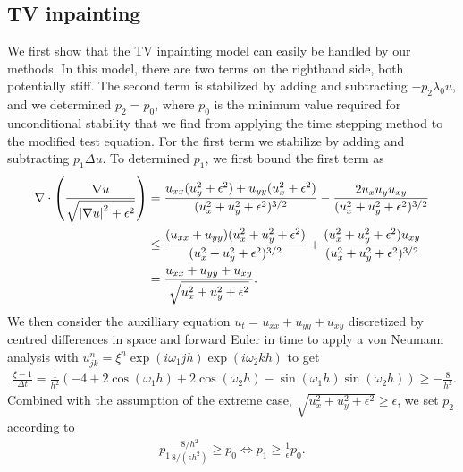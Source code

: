 \subsection{TV inpainting}
We first show that the TV inpainting model can easily be handled by our methods. In this model, there are two terms on the righthand side, both potentially stiff.  The second term is stabilized by adding and subtracting $-p_2\lambda_0 u$, and we determined $p_2=p_0$, where $p_0$ is the minimum value required for unconditional stability that we find from applying the time stepping method to the modified test equation. For the first term we stabilize by adding and subtracting $p_1\Delta u$. To determined $p_1$, we first bound the first term as 
\begin{align}
\begin{split}
        \nabla \cdot \left(\frac{\nabla u}{\sqrt{\left|\nabla u\right|^2 + \epsilon^2}} \right) 
&= \frac{u_{xx}(u_y^2 + \epsilon^2) + u_{yy}(u_x^2 + \epsilon^2)}{(u_x^2 + u_y^2 + \epsilon^2)^{3/2}} 
- \frac{2u_xu_y u_{xy}}{(u_x^2 + u_y^2 + \epsilon^2)^{3/2}} 
\\
&\leq \frac{(u_{xx}+u_{yy})(u_x^2 + u_y^2 + \epsilon^2)}{(u_x^2 + u_y^2 + \epsilon^2)^{3/2}} + \frac{(u_x^2 + u_y^2 + \epsilon^2)u_{xy}}{(u_x^2 + u_y^2 + \epsilon^2)^{3/2}}  
\\
&= \frac{u_{xx} + u_{yy} + u_{xy}}{\sqrt{u_x^2 + u_y^2 + \epsilon^2}}.
\end{split}
\label{p1 estimate inpaint 1}
\end{align}
We then consider the auxilliary equation $u_t = u_{xx} + u_{yy} + u_{xy}$ discretized by centred differences in space and forward Euler in time to apply a von Neumann analysis with $u^n_{jk} = \xi^n \exp(i\omega_1jh)\exp(i\omega_2kh)$ to get 
\begin{align}
        \frac{\xi  - 1}{\Delta t} 
= \frac{1}{h^2}(-4 + 2\cos(\omega_1 h) + 2\cos(\omega_2 h) - \sin(\omega_1 h)\sin(\omega_2h))
\geq -\frac{8}{h^2}.
\label{p1 estimate inpaint 2}
\end{align}
Combined with the assumption of the extreme case, $\sqrt{u_x^2 + u_y^2 + \epsilon^2} \geq \epsilon$, we set $p_2$ according to 
\begin{align}
        p_1\frac{8/h^2}{8/(\epsilon h^2)} \geq p_0 \iff 
p_1 \geq \frac{1}{\epsilon}p_0.
\end{align}

